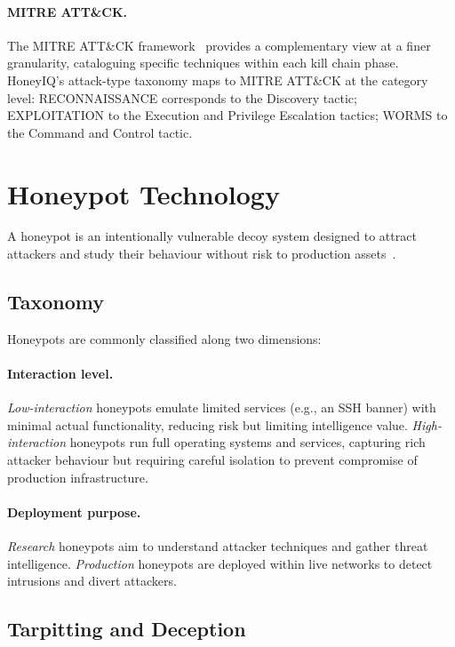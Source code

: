\paragraph{MITRE ATT\&CK.}
The MITRE ATT\&CK framework~\citep{strom2018mitre} provides a complementary
view at a finer granularity, cataloguing specific techniques within each
kill chain phase.
HoneyIQ's attack-type taxonomy maps to MITRE ATT\&CK at the category level:
RECONNAISSANCE corresponds to the Discovery tactic; EXPLOITATION to the
Execution and Privilege Escalation tactics; WORMS to the Command and
Control tactic.

\section{Honeypot Technology}
\label{sec:bg_honeypot}

A honeypot is an intentionally vulnerable decoy system designed to attract
attackers and study their behaviour without risk to production
assets~\citep{spitzner2003honeypot, cheswick1992evening}.

\subsection{Taxonomy}

Honeypots are commonly classified along two dimensions:

\paragraph{Interaction level.}
\emph{Low-interaction} honeypots emulate limited services (e.g., an SSH
banner) with minimal actual functionality, reducing risk but limiting
intelligence value.
\emph{High-interaction} honeypots run full operating systems and services,
capturing rich attacker behaviour but requiring careful isolation to prevent
compromise of production infrastructure.

\paragraph{Deployment purpose.}
\emph{Research} honeypots aim to understand attacker techniques and gather
threat intelligence.
\emph{Production} honeypots are deployed within live networks to detect
intrusions and divert attackers.

\subsection{Tarpitting and Deception}


